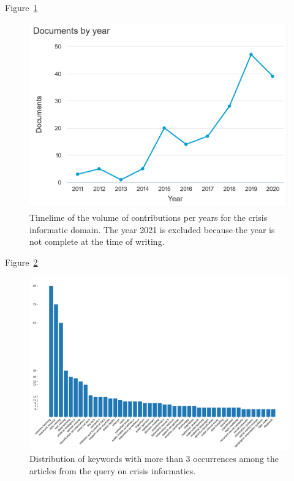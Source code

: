 Figure~\ref{literature:nlp-hist}

\begin{figure}[bp]
    \centering
    \includegraphics[width=\textwidth]{figures/chap-2/nlp-hist.pdf}
    \caption{Timelime of the volume of contributions per years for the crisis informatic domain. The year 2021 is excluded because the year is not complete at the time of writing.}
    \label{literature:nlp-hist}
\end{figure}

Figure~\ref{literature:nlp-bar}

\begin{figure}[bp]
    \centering
    \includegraphics[width=\textwidth]{figures/chap-2/nlp-bar.pdf}
    \caption{Distribution of keywords with more than 3 occurrences among the articles from the query on crisis informatics. }
    \label{literature:nlp-bar}
\end{figure}


